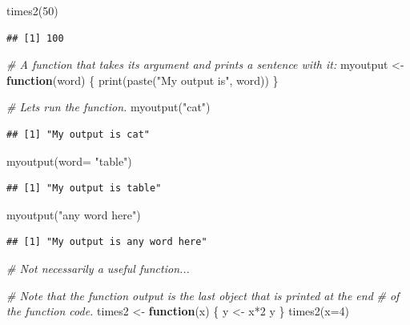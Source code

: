 \documentclass[
]{book}
\newenvironment{Shaded}{\begin{snugshade}}{\end{snugshade}}
\newcommand{\AttributeTok}[1]{\textcolor[rgb]{0.77,0.63,0.00}{#1}}
\newcommand{\CommentTok}[1]{\textcolor[rgb]{0.56,0.35,0.01}{\textit{#1}}}
\newcommand{\ControlFlowTok}[1]{\textcolor[rgb]{0.13,0.29,0.53}{\textbf{#1}}}
\newcommand{\DecValTok}[1]{\textcolor[rgb]{0.00,0.00,0.81}{#1}}
\newcommand{\FunctionTok}[1]{\textcolor[rgb]{0.00,0.00,0.00}{#1}}
\newcommand{\NormalTok}[1]{#1}
\newcommand{\OtherTok}[1]{\textcolor[rgb]{0.56,0.35,0.01}{#1}}
\newcommand{\SpecialCharTok}[1]{\textcolor[rgb]{0.00,0.00,0.00}{#1}}
\newcommand{\StringTok}[1]{\textcolor[rgb]{0.31,0.60,0.02}{#1}}
\begin{document}
\begin{Shaded}
\begin{Highlighting}[]
\FunctionTok{times2}\NormalTok{(}\DecValTok{50}\NormalTok{)}
\end{Highlighting}
\end{Shaded}

\begin{verbatim}
## [1] 100
\end{verbatim}

\begin{Shaded}
\begin{Highlighting}[]
\CommentTok{\# A function that takes its argument and prints a sentence with it:}
\NormalTok{myoutput }\OtherTok{\textless{}{-}} \ControlFlowTok{function}\NormalTok{(word) \{}
  \FunctionTok{print}\NormalTok{(}\FunctionTok{paste}\NormalTok{(}\StringTok{"My output is"}\NormalTok{, word))}
\NormalTok{\}}

\CommentTok{\# Let\textquotesingle{}s run the function.}
\FunctionTok{myoutput}\NormalTok{(}\StringTok{"cat"}\NormalTok{)}
\end{Highlighting}
\end{Shaded}

\begin{verbatim}
## [1] "My output is cat"
\end{verbatim}

\begin{Shaded}
\begin{Highlighting}[]
\FunctionTok{myoutput}\NormalTok{(}\AttributeTok{word=} \StringTok{"table"}\NormalTok{)}
\end{Highlighting}
\end{Shaded}

\begin{verbatim}
## [1] "My output is table"
\end{verbatim}

\begin{Shaded}
\begin{Highlighting}[]
\FunctionTok{myoutput}\NormalTok{(}\StringTok{"any word here"}\NormalTok{)}
\end{Highlighting}
\end{Shaded}

\begin{verbatim}
## [1] "My output is any word here"
\end{verbatim}

\begin{Shaded}
\begin{Highlighting}[]
\CommentTok{\# Not necessarily a useful function...}

\CommentTok{\# Note that the function output is the last object that is printed at the end}
\CommentTok{\# of the function code.}
\NormalTok{times2 }\OtherTok{\textless{}{-}} \ControlFlowTok{function}\NormalTok{(x) \{}
\NormalTok{  y }\OtherTok{\textless{}{-}}\NormalTok{ x}\SpecialCharTok{*}\DecValTok{2}
\NormalTok{  y}
\NormalTok{\}}
\FunctionTok{times2}\NormalTok{(}\AttributeTok{x=}\DecValTok{4}\NormalTok{)}
\end{Highlighting}
\end{Shaded}
\end{document}
